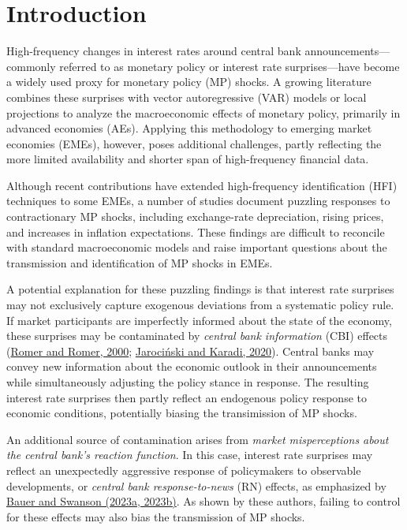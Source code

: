 \documentclass[12pt, reqno]{article}
\begin{document}
\bigskip
\bigskip
\bigskip
\bigskip







\pagebreak

\section{Introduction}
\setcounter{page}{1}

High-frequency changes in interest rates around central bank announcements—commonly referred to as monetary policy or interest rate surprises—have become a widely used proxy for monetary policy (MP) shocks. A growing literature combines these surprises with vector autoregressive (VAR) models or local projections to analyze the macroeconomic effects of monetary policy, primarily in advanced economies (AEs). Applying this methodology to emerging market economies (EMEs), however, poses additional challenges, partly reflecting the more limited availability and shorter span of high-frequency financial data. 

Although recent contributions have extended high-frequency identification (HFI) techniques to some EMEs, a number of studies document puzzling responses to contractionary MP shocks, including exchange-rate depreciation, rising prices, and increases in inflation expectations. These findings are difficult to reconcile with standard macroeconomic models and raise important questions about the transmission and identification of MP shocks in EMEs.

A potential explanation for these puzzling findings is that interest rate surprises may not exclusively capture exogenous deviations from a systematic policy rule. If market participants are imperfectly informed about the state of the economy, these surprises may be contaminated by \emph{central bank information} (CBI) effects (\hyperlink{Romer and Romer (2000)}{Romer and Romer, 2000}; \hyperlink{Jarociński and Karadi (2020)}{Jarociński and Karadi, 2020}). Central banks may convey new information about the economic outlook in their announcements while simultaneously adjusting the policy stance in response. The resulting interest rate surprises then partly reflect an endogenous policy response to economic conditions, potentially biasing the transimission of MP shocks.

An additional source of contamination arises from \emph{market misperceptions about the central bank’s reaction function}. In this case, interest rate surprises may reflect an unexpectedly aggressive response of policymakers to observable developments, or \emph{central bank response-to-news} (RN) effects, as emphasized by \hyperlink{Bauer and Swanson (2023a, 2023b)}{Bauer and Swanson (2023a, 2023b)}. As shown by these authors, failing to control for these effects may also bias the transmission of MP shocks.
\end{document}
